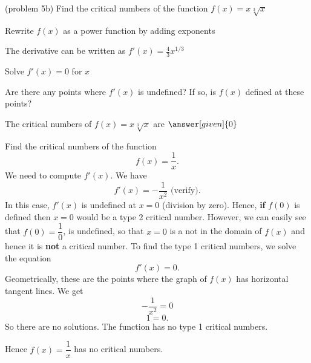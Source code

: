 \documentclass{ximera}
\begin{document}
\begin{problem}(problem 5b)
  Find the critical numbers of the function $f(x) = x\sqrt[3]x$
  
    \begin{hint}
      Rewrite $f(x)$ as a power function by adding exponents
    \end{hint}
    \begin{hint}
      The derivative can be written as $f'(x) = \frac43 x^{1/3}$
    \end{hint}
		\begin{hint}
      Solve $f'(x) = 0$ for $x$
    \end{hint}
    \begin{hint}
      Are there any points where $f'(x)$ is undefined?
      If so, is $f(x)$ defined at these points?  
		\end{hint}
    
    
		The critical numbers of $f(x) = x\sqrt[3]x$ are
		 $\answer[given]{0}$
		
\end{problem}



\begin{example}[example 6]  Find the critical numbers of the function 
\[f(x) = \dfrac{1}{x}.\]
We need to compute $f'(x)$.  We have
\[f'(x) = -\frac{1}{ x^2} \mbox{   (verify)}.\]
In this case, $f'(x)$ is undefined at $x = 0$ (division by zero). Hence,  {\bf if}
$f(0)$ is defined then $x=0$ would be a type 2 critical number.  However, we can easily see that $f(0) = \dfrac{1}{0}$, is undefined,  so 
that $x=0$ is a not in the domain of $f(x)$ and hence it is {\bf not} a critical number.
To find the type 1 critical numbers, we solve the equation
\[f'(x) = 0.\]
Geometrically, these are the points where the graph of $f(x)$ has horizontal tangent lines.
We get
\[ -\frac{1}{ x^2}  =0\]
\[ 1 =0.\]
So there are no solutions.  The function has no type 1 critical numbers.


Hence $f(x) = \dfrac{1}{x}$ has no critical numbers. 

\begin{image}
\end{image}


\end{example}
\end{document}
